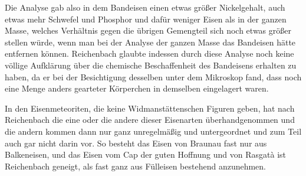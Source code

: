 \documentclass[a4paper, 11pt, oneside]{article}
\begin{document}
Die Analyse gab also in dem Bandeisen einen etwas größer Nickelgehalt, auch etwas mehr Schwefel und Phosphor und dafür weniger Eisen als in der ganzen Masse, welches Verhältnis gegen die übrigen Gemengteil sich noch etwas größer stellen würde, wenn man bei der Analyse der ganzen Masse das Bandeisen hätte entfernen können. Reichenbach glaubte indessen durch diese Analyse noch keine völlige Aufklärung über die chemische Beschaffenheit des Bandeisens erhalten zu haben, da er bei der Besichtigung desselben unter dem Mikroskop fand, dass noch eine Menge anders gearteter Körperchen in demselben eingelagert waren.

In den Eisenmeteoriten, die keine Widmanstättenschen Figuren geben, hat nach Reichenbach die eine oder die andere dieser Eisenarten überhandgenommen und die andern kommen dann nur ganz unregelmäßig und untergeordnet und zum Teil auch gar nicht darin vor. So besteht das Eisen von Braunau fast nur aus Balkeneisen, und das Eisen vom Cap der guten Hoffnung und von Rasgatà ist Reichenbach geneigt, als fast ganz aus Fülleisen bestehend anzunehmen.
\end{document}
